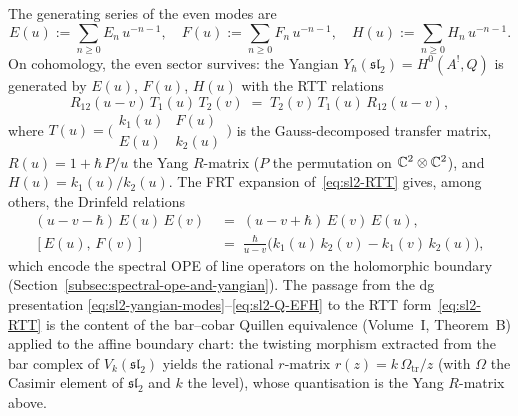 The generating series of the even modes are
\begin{equation}\label{eq:sl2-dual-generators}
E(u) := \sum_{n \ge 0} E_n\, u^{-n-1},
\quad
F(u) := \sum_{n \ge 0} F_n\, u^{-n-1},
\quad
H(u) := \sum_{n \ge 0} H_n\, u^{-n-1}.
\end{equation}
On cohomology, the even sector survives: the Yangian
$Y_\hbar(\mathfrak{sl}_2) = H^0(A^!, Q)$ is
generated by $E(u)$, $F(u)$, $H(u)$ with the
RTT relations
\begin{equation}\label{eq:sl2-RTT}
R_{12}(u - v)\, T_1(u)\, T_2(v)
\;=\;
T_2(v)\, T_1(u)\, R_{12}(u - v),
\end{equation}
where $T(u) = \bigl(\begin{smallmatrix}
k_1(u) & F(u) \\ E(u) & k_2(u)
\end{smallmatrix}\bigr)$ is the Gauss-decomposed
transfer matrix, $R(u) = 1 + \hbar\, P/u$ the
Yang $R$-matrix ($P$ the permutation on
$\mathbb{C}^2 \otimes \mathbb{C}^2$), and
$H(u) = k_1(u)/k_2(u)$.
The FRT expansion of~\eqref{eq:sl2-RTT} gives, among
others, the Drinfeld relations
\begin{align}
(u - v - \hbar)\, E(u)\, E(v)
&\;=\;
(u - v + \hbar)\, E(v)\, E(u),
\label{eq:cs-drinfeld-EE}
\\[3pt]
[E(u),\, F(v)]
&\;=\;
\frac{\hbar}{u - v}
\bigl(k_1(u)\, k_2(v) - k_1(v)\, k_2(u)\bigr),
\label{eq:cs-drinfeld-EF}
\end{align}
which encode the spectral OPE of line operators
on the holomorphic boundary
(Section~\ref{subsec:spectral-ope-and-yangian}).
The passage from the dg presentation
\eqref{eq:sl2-yangian-modes}--\eqref{eq:sl2-Q-EFH}
to the RTT form~\eqref{eq:sl2-RTT} is the
content of the bar--cobar Quillen equivalence
(Volume~I, Theorem~B) applied to the affine
boundary chart: the twisting morphism extracted
from the bar complex of $V_k(\mathfrak{sl}_2)$
yields the rational $r$-matrix
$r(z) = k\,\Omega_{\mathrm{tr}}/z$ (with $\Omega$ the Casimir
element of $\mathfrak{sl}_2$ and $k$ the level), whose quantisation
is the Yang $R$-matrix above.

